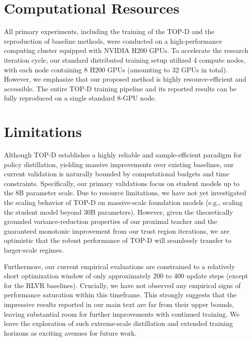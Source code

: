 \documentclass{article}
\theoremstyle{plain}
\theoremstyle{definition}
\theoremstyle{remark}
\begin{document}
\section*{Computational Resources}
All primary experiments, including the training of the TOP-D and the reproduction of baseline methods, were conducted on a high-performance computing cluster equipped with NVIDIA H200 GPUs. To accelerate the research iteration cycle, our standard distributed training setup utilized 4 compute nodes, with each node containing 8 H200 GPUs (amounting to 32 GPUs in total). However, we emphasize that our proposed method is highly resource-efficient and accessible. The entire TOP-D training pipeline and its reported results can be fully reproduced on a single standard 8-GPU node.





\section*{Limitations}
Although TOP-D establishes a highly reliable and sample-efficient paradigm for policy distillation, yielding massive improvements over existing baselines, our current validation is naturally bounded by computational budgets and time constraints. Specifically, our primary validations focus on student models up to the 8B parameter scale. Due to resource limitations, we have not yet investigated the scaling behavior of TOP-D on massive-scale foundation models (e.g., scaling the student model beyond 30B parameters). However, given the theoretically grounded variance-reduction properties of our proximal teacher and the guaranteed monotonic improvement from our trust region iterations, we are optimistic that the robust performance of TOP-D will seamlessly transfer to larger-scale regimes. 

Furthermore, our current empirical evaluations are constrained to a relatively short optimization window of only approximately 200 to 400 update steps (except for the RLVR baselines). Crucially, we have not observed any empirical signs of performance saturation within this timeframe. This strongly suggests that the impressive results reported in our main text are far from their upper bounds, leaving substantial room for further improvements with continued training. We leave the exploration of such extreme-scale distillation and extended training horizons as exciting avenues for future work.

\newpage
\end{document}
